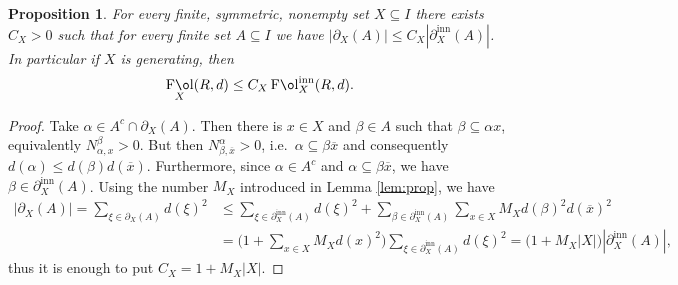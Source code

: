 \documentclass[11 pt, leqno]{amsart}
\newcommand{\ov}{\overline}
\DeclareMathOperator{\Fol}{F\mathrm{\o}l}
\newcommand{\FolinnX}{\operatorname{F\mathrm{\o}l}_{X}^{\operatorname{inn}}}
\DeclareMathOperator{\inn}{inn}
\newtheorem{proposition}[theorem]{Proposition}
\theoremstyle{definition}
\numberwithin{equation}{section}
\begin{document}
\begin{proposition}\label{prop:C_X}
	For every finite, symmetric, nonempty set $X \subseteq I$ there exists $C_X>0$ such that for every finite set $A\subseteq I$ we have $|\partial_X (A)| \leq C_X |\partial^{\inn}_X(A)|$. In particular if $X$ is generating, then 
\[
\Fol_X(R,d)\le C_X \FolinnX(R,d).
\]
\end{proposition}


\begin{proof}
	Take $\alpha\in A^c \cap \partial_X(A)$. Then there is $x\in X$ and $\beta\in A$ such that $\beta\subseteq \alpha x$, equivalently $N^{\beta}_{\alpha, x}>0$. But then $N^{\alpha}_{\beta, \ov{x}}>0$, i.e.~$\alpha\subseteq \beta \ov{x}$ and consequently $d(\alpha)\le d(\beta)d(\ov{x})$. Furthermore, since $\alpha\in A^c$ and $\alpha\subseteq \beta \ov{x}$, we have $\beta\in \partial_X^{\inn}(A)$. Using the number $M_X$ introduced in Lemma \ref{lem:prop}, we have
\begin{align*}
|\partial_X(A)|=	\sum_{\xi \in\partial_X(A)}d(\xi)^2 &\le 
	\sum_{\xi \in \partial_X^{\inn}(A)}d(\xi)^2+\sum_{\beta\in \partial_X^{\inn}(A)}\sum_{x\in X}M_X d(\beta)^2 d(\ov x)^2 \\
	&=
	\bigl(1+\sum_{x\in X}M_Xd(x)^2\bigr) \sum_{\xi\in \partial_X^{\inn}(A)} d(\xi)^2=
	\bigl(1+M_X |X|\bigr) |\partial_X^{\inn}(A)|,
\end{align*}
thus it is enough to put $C_X=1+M_X |X|$.
\end{proof}
\end{document}

